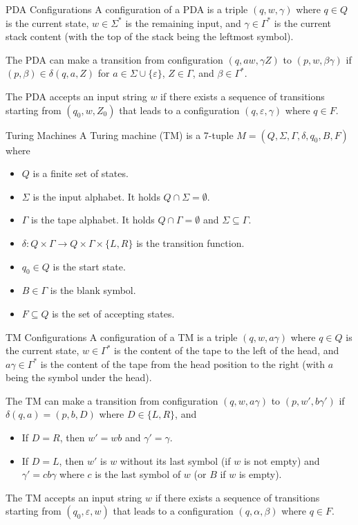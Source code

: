 \documentclass{beamer}
\begin{document}
\begin{frame}{PDA Configurations}
    A configuration of a PDA is a triple $(q,w,\gamma)$ where $q\in Q$ is the current state, $w\in \Sigma^*$ is the remaining input, and $\gamma\in \Gamma^*$ is the current stack content (with the top of the stack being the leftmost symbol).
    
    The PDA can make a transition from configuration $(q,aw,\gamma Z)$ to $(p,w,\beta \gamma)$ if $(p,\beta)\in \delta(q,a,Z)$ for $a\in \Sigma\cup\{\varepsilon\}$, $Z\in \Gamma$, and $\beta\in \Gamma^*$.
    
    The PDA accepts an input string $w$ if there exists a sequence of transitions starting from $(q_0,w,Z_0)$ that leads to a configuration $(q,\varepsilon,\gamma)$ where $q\in F$.
\end{frame}
\begin{frame}{Turing Machines}
    A Turing machine (TM) is a 7-tuple $M=(Q,\Sigma,\Gamma,\delta,q_0,B,F)$ where
    \begin{itemize}
        \item $Q$ is a finite set of states.
        \item $\Sigma$ is the input alphabet. It holds $Q\cap \Sigma=\emptyset$.
        \item $\Gamma$ is the tape alphabet. It holds $Q\cap \Gamma=\emptyset$ and $\Sigma\subseteq \Gamma$.
        \item $\delta:Q\times \Gamma\to Q\times \Gamma\times \{L,R\}$ is the transition function.
        \item $q_0\in Q$ is the start state.
        \item $B\in \Gamma$ is the blank symbol.
        \item $F\subseteq Q$ is the set of accepting states.
    \end{itemize}
\end{frame}

\begin{frame}{TM Configurations}
    A configuration of a TM is a triple $(q,w,a\gamma)$ where $q\in Q$ is the current state, $w\in \Gamma^*$ is the content of the tape to the left of the head, and $a\gamma\in \Gamma^*$ is the content of the tape from the head position to the right (with $a$ being the symbol under the head).
    
    The TM can make a transition from configuration $(q,w,a\gamma)$ to $(p,w',b\gamma')$ if $\delta(q,a)=(p,b,D)$ where $D\in \{L,R\}$, and
    \begin{itemize}
        \item If $D=R$, then $w'=wb$ and $\gamma'=\gamma$.
        \item If $D=L$, then $w'$ is $w$ without its last symbol (if $w$ is not empty) and $\gamma'=c b \gamma$ where $c$ is the last symbol of $w$ (or $B$ if $w$ is empty).
    \end{itemize}
    
    The TM accepts an input string $w$ if there exists a sequence of transitions starting from $(q_0,\varepsilon,w)$ that leads to a configuration $(q,\alpha,\beta)$ where $q\in F$.

\end{frame}
\end{document}
